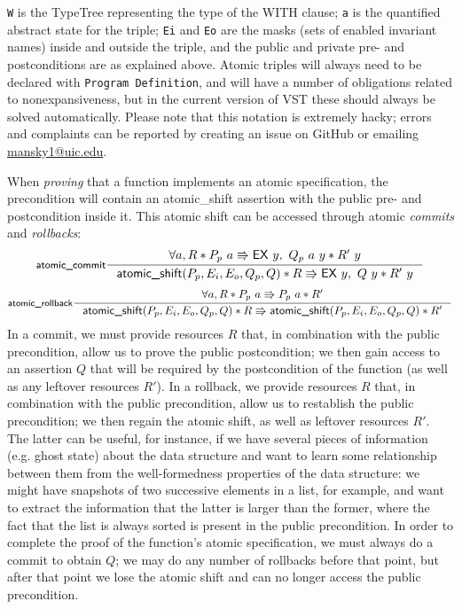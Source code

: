 \documentclass[11pt]{article}
\begin{document}
\texttt{W} is the \textsf{TypeTree} representing the type of the WITH clause; \texttt{a} is the quantified abstract state for the triple; \texttt{Ei} and \texttt{Eo} are the masks (sets of enabled invariant names) inside and outside the triple, and the public and private pre- and postconditions are as explained above. Atomic triples will always need to be declared with \texttt{Program Definition}, and will have a number of obligations related to nonexpansiveness, but in the current version of VST these should always be solved automatically. Please note that this notation is extremely hacky; errors and complaints can be reported by creating an issue on GitHub or emailing \url{mansky1@uic.edu}.

When \emph{proving} that a function implements an atomic specification, the precondition will contain an \textsf{atomic\_shift} assertion with the public pre- and postcondition inside it. This atomic shift can be accessed through atomic \emph{commits} and \emph{rollbacks}:
$$\inference[\textsf{atomic\_commit}]{\forall a, R * P_p\ a \Rrightarrow \mathsf{EX}\ y,\ Q_p\ a\ y * R'\ y}{\textsf{atomic\_shift}(P_p, E_i, E_o, Q_p, Q) * R \Rrightarrow \mathsf{EX}\ y,\ Q\ y * R'\ y}$$
$$\inference[\textsf{atomic\_rollback}]{\forall a, R * P_p\ a \Rrightarrow P_p\ a * R'}{\textsf{atomic\_shift}(P_p, E_i, E_o, Q_p, Q) * R \Rrightarrow \textsf{atomic\_shift}(P_p, E_i, E_o, Q_p, Q) * R'}$$
In a commit, we must provide resources $R$ that, in combination with the public precondition, allow us to prove the public postcondition; we then gain access to an assertion $Q$ that will be required by the postcondition of the function (as well as any leftover resources $R'$). In a rollback, we provide resources $R$ that, in combination with the public precondition, allow us to restablish the public precondition; we then regain the atomic shift, as well as leftover resources $R'$. The latter can be useful, for instance, if we have several pieces of information (e.g. ghost state) about the data structure and want to learn some relationship between them from the well-formedness properties of the data structure: we might have snapshots of two successive elements in a list, for example, and want to extract the information that the latter is larger than the former, where the fact that the list is always sorted is present in the public precondition. In order to complete the proof of the function's atomic specification, we must always do a commit to obtain $Q$; we may do any number of rollbacks before that point, but after that point we lose the atomic shift and can no longer access the public precondition.
\end{document}
